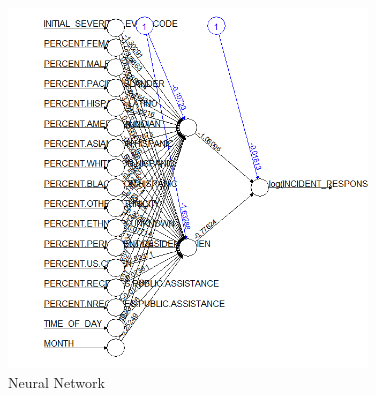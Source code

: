 \documentclass[twoside,11pt]{article}
\begin{document}
\begin{figure}[H]
    \centering
    \includegraphics[width = 0.85\textwidth]{neuralnet.png}
    \caption{Neural Network}
\end{figure}


\newpage
\printbibliography
\end{document}
